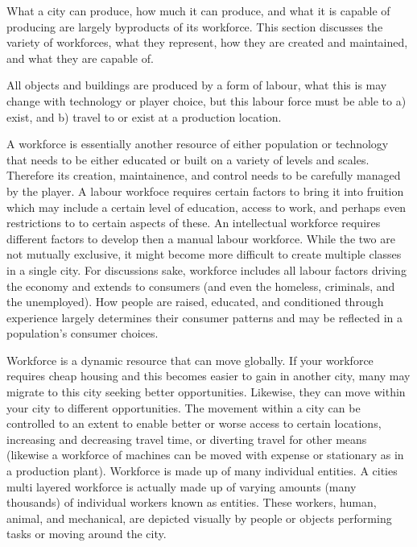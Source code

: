 

What a city can produce, how much it can produce, and what it is capable of producing are largely byproducts of its workforce. This section discusses the variety of workforces, what they represent, how they are created and maintained, and what they are capable of. 

All objects and buildings are produced by a form of labour, what this is may change with technology or player choice, but this labour force must be able to a) exist, and b) travel to or exist at a production location.

A workforce is essentially another resource of either population or technology that needs to be either educated or built on a variety of levels and scales. Therefore its creation, maintainence, and control needs to be carefully managed by the player. A labour workfoce requires certain factors to bring it into fruition which may include a certain level of education, access to work, and perhaps even restrictions to to certain aspects of these. An intellectual workforce requires different factors to develop then a manual labour workforce. While the two are not mutually exclusive, it might become more difficult to create multiple classes in a single city. For discussions sake, workforce includes all labour factors driving the economy and extends to consumers (and even the homeless, criminals, and the unemployed). How people are raised, educated, and conditioned through experience largely determines their consumer patterns and may be reflected in a population's consumer choices.

Workforce is a dynamic resource that can move globally. If your workforce requires cheap housing and this becomes easier to gain in another city, many may migrate to this city seeking better opportunities. Likewise, they can move within your city to different opportunities. The movement within a city can be controlled to an extent to enable better or worse access to certain locations, increasing and decreasing travel time, or diverting travel for other means (likewise a workforce of machines can be moved with expense or stationary as in a production plant). Workforce is made up of many individual entities. A cities multi layered workforce is actually made up of varying amounts (many thousands) of individual workers known as entities. These workers, human, animal, and mechanical, are depicted visually by people or objects performing tasks or moving around the city.

